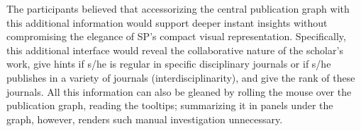 The participants believed that accessorizing the central publication graph with this additional information would support deeper instant insights without compromising the elegance of SP's compact visual representation. Specifically, this additional interface would reveal the collaborative nature of the scholar's work, give hints if s/he is regular in specific disciplinary journals or if s/he publishes in a variety of journals (interdisciplinarity), and give the rank of these journals. All this information can also be gleaned by rolling the mouse over the publication graph, reading the tooltips; summarizing it in panels under the graph, however, renders such manual investigation unnecessary.